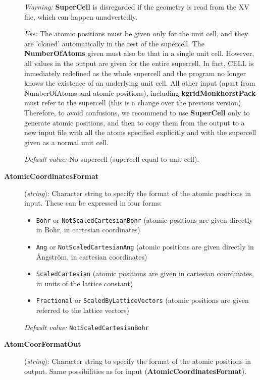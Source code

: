 \documentclass[11pt]{article}
\begin{document}
\begin{description}
{\it Warning:} {\bf SuperCell} is disregarded if the geometry is read from
the XV file, which can happen unadvertedly.

{\it Use:} The atomic positions must be given only for the unit cell,
and they are 'cloned' automatically in the rest of the supercell.
The {\bf NumberOfAtoms} given must also be that in a single unit cell.
However, all values in the output are given for the entire supercell. 
In fact, CELL is inmediately redefined as the whole supercell and the 
program no longer knows the existence of an underlying unit cell.
All other input (apart from NumberOfAtoms and atomic positions), 
including {\bf kgridMonkhorstPack} must refer to the supercell 
(this is a change over the previous version). Therefore, to avoid
confusions, we recommend to use {\bf SuperCell} only to
generate atomic positions, and then to copy them from the output
to a new input file with all the atoms specified explicitly and
with the supercell given as a normal unit cell.

{\it Default value:} No supercell (supercell equal to unit cell).


\item[{\bf AtomicCoordinatesFormat}] ({\it string}): 
Character string to specify the format of the atomic positions in
input. These can be expressed in four forms:
\begin{itemize}
\item {\tt Bohr} or {\tt NotScaledCartesianBohr} (atomic positions 
are given directly in Bohr, in cartesian coordinates)
\item {\tt Ang} or {\tt NotScaledCartesianAng} (atomic positions 
are given directly in {\AA}ngstr\"om, in cartesian coordinates)
\item {\tt ScaledCartesian} (atomic positions are given 
in cartesian coordinates, in units of the lattice constant)
\item {\tt Fractional} or {\tt ScaledByLatticeVectors} (atomic positions 
are given referred to the lattice vectors)
\end{itemize}

{\it Default value:} {\tt NotScaledCartesianBohr}


\item[{\bf AtomCoorFormatOut}] ({\it string}): 
Character string to specify the format of the atomic positions in output.
Same possibilities as for input ({\bf AtomicCoordinatesFormat}).


\end{description}
\end{document}
